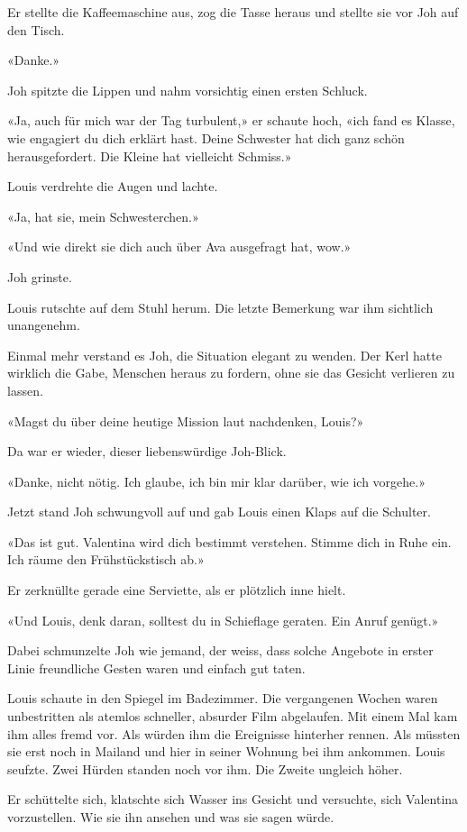 Er stellte die Kaffeemaschine aus, zog die Tasse heraus und stellte sie
vor Joh auf den Tisch.

«Danke.»

Joh spitzte die Lippen und nahm vorsichtig einen ersten Schluck.

«Ja, auch für mich war der Tag turbulent,» er schaute hoch, «ich fand es
Klasse, wie engagiert du dich erklärt hast. Deine Schwester hat dich
ganz schön herausgefordert. Die Kleine hat vielleicht Schmiss.»

Louis verdrehte die Augen und lachte.

«Ja, hat sie, mein Schwesterchen.»

«Und wie direkt sie dich auch über Ava ausgefragt hat, wow.»

Joh grinste.

Louis rutschte auf dem Stuhl herum. Die letzte Bemerkung war ihm
sichtlich unangenehm.

Einmal mehr verstand es Joh, die Situation elegant zu wenden. Der Kerl
hatte wirklich die Gabe, Menschen heraus zu fordern, ohne sie das
Gesicht verlieren zu lassen.

«Magst du über deine heutige Mission laut nachdenken, Louis?»

Da war er wieder, dieser liebenswürdige Joh-Blick.

«Danke, nicht nötig. Ich glaube, ich bin mir klar darüber, wie ich
vorgehe.»

Jetzt stand Joh schwungvoll auf und gab Louis einen Klaps auf die
Schulter.

«Das ist gut. Valentina wird dich bestimmt verstehen. Stimme dich in
Ruhe ein. Ich räume den Frühstückstisch ab.»

Er zerknüllte gerade eine Serviette, als er plötzlich inne hielt.

«Und Louis, denk daran, solltest du in Schieflage geraten. Ein Anruf
genügt.»

Dabei schmunzelte Joh wie jemand, der weiss, dass solche Angebote in
erster Linie freundliche Gesten waren und einfach gut taten.

Louis schaute in den Spiegel im Badezimmer. Die vergangenen Wochen waren
unbestritten als atemlos schneller, absurder Film abgelaufen. Mit einem
Mal kam ihm alles fremd vor. Als würden ihm die Ereignisse hinterher
rennen. Als müssten sie erst noch in Mailand und hier in seiner Wohnung
bei ihm ankommen. Louis seufzte. Zwei Hürden standen noch vor ihm. Die
Zweite ungleich höher.

Er schüttelte sich, klatschte sich Wasser ins Gesicht und versuchte,
sich Valentina vorzustellen. Wie sie ihn ansehen und was sie sagen
würde.

